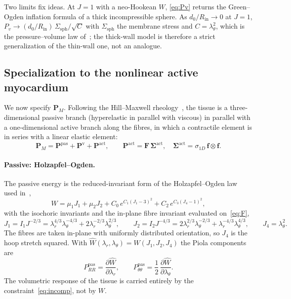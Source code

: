 \documentclass[11pt,a4paper]{article}
\newcommand{\bF}{\mathbf F}
\newcommand{\bP}{\mathbf P}
\newcommand{\bfib}{\mathbf f}
\newcommand{\Rin}{R_{\mathrm{in}}}
\newcommand{\lt}{\lambda_\theta}
\newcommand{\lr}{\lambda_r}
\newcommand{\sig}{\sigma_{1D}}
\newcommand{\Pm}{\bP_{\!M}}
\begin{document}
Two limits fix ideas. At $J=1$ with a neo-Hookean $W$, \eqref{eq:Pv} returns the Green--Ogden inflation formula of a thick incompressible sphere. As $d_0/\Rin\to0$ at $J=1$, $P_v\to(d_0/\Rin)\,\Sigma_{\mathrm{sph}}/\sqrt C$ with $\Sigma_{\mathrm{sph}}$ the membrane stress and $C=\lt^2$, which is the pressure--volume law of~\cite{Caruel2014}; the thick-wall model is therefore a strict generalization of the thin-wall one, not an analogue.

\subsection{Specialization to the nonlinear active myocardium}
\label{sec:specific}

We now specify $\Pm$. Following the Hill--Maxwell rheology~\cite{Chapelle2012,Caruel2014}, the tissue is a three-dimensional passive branch (hyperelastic in parallel with viscous) in parallel with a one-dimensional active branch along the fibres, in which a contractile element is in series with a linear elastic element:
\begin{equation}
  \Pm=\bP^{\mathrm{pas}}+\bP^{\mathrm{v}}+\bP^{\mathrm{act}},\qquad
  \bP^{\mathrm{act}}=\bF\,\boldsymbol\Sigma^{\mathrm{act}},\quad
  \boldsymbol\Sigma^{\mathrm{act}}=\sig\,\bfib\otimes\bfib .
  \label{eq:hillmaxwell}
\end{equation}

\paragraph{Passive: Holzapfel--Ogden.}
The passive energy is the reduced-invariant form of the Holzapfel--Ogden law used in~\cite{Caruel2014},
\begin{equation}
  W=\mu_1J_1+\mu_2J_2+C_0\,e^{C_1(J_1-3)^2}+C_2\,e^{C_3(J_4-1)^2},
  \label{eq:holzapfel}
\end{equation}
with the isochoric invariants and the in-plane fibre invariant evaluated on~\eqref{eq:F},
\begin{equation}
  J_1=I_1J^{-2/3}=\lr^{4/3}\lt^{-4/3}+2\lr^{-2/3}\lt^{2/3},\qquad
  J_2=I_2J^{-4/3}=2\lr^{2/3}\lt^{-2/3}+\lr^{-4/3}\lt^{4/3},\qquad
  J_4=\lt^2 .
  \label{eq:invariants}
\end{equation}
The fibres are taken in-plane with uniformly distributed orientation, so $J_4$ is the hoop stretch squared. With $\widehat W(\lr,\lt)=W(J_1,J_2,J_4)$ the Piola components are
\begin{equation}
  P_{RR}^{\mathrm{pas}}=\frac{\partial\widehat W}{\partial\lr},\qquad
  P_{\theta\theta}^{\mathrm{pas}}=\frac12\,\frac{\partial\widehat W}{\partial\lt}.
  \label{eq:Ppas}
\end{equation}
The volumetric response of the tissue is carried entirely by the constraint~\eqref{eq:incomp}, not by $W$.
\end{document}
